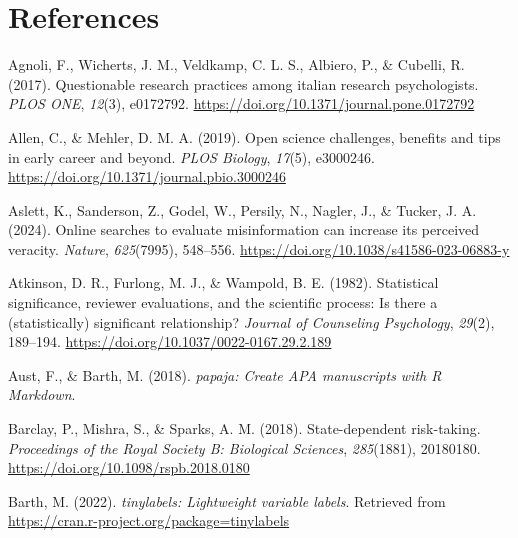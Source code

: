 \documentclass[
  ,man,mask,floatsintext]{apa6}
\newlength{\cslhangindent}
\newlength{\cslentryspacingunit} %
\newenvironment{CSLReferences}[2] %
 {%
  \setlength{\parindent}{0pt}
  \ifodd #1
  \let\oldpar\par
  \def\par{\hangindent=\cslhangindent\oldpar}
  \fi
  \setlength{\parskip}{#2\cslentryspacingunit}
 }%
 {}
\begin{document}
\hypertarget{references}{%
\section{References}\label{references}}

\setlength{\parindent}{-0.2in}
\setlength{\leftskip}{0.2in}


\hypertarget{refs}{}
\begin{CSLReferences}{1}{0}
\leavevmode{}%
Agnoli, F., Wicherts, J. M., Veldkamp, C. L. S., Albiero, P., \& Cubelli, R. (2017). Questionable research practices among italian research psychologists. \emph{PLOS ONE}, \emph{12}(3), e0172792. \url{https://doi.org/10.1371/journal.pone.0172792}

\leavevmode{}%
Allen, C., \& Mehler, D. M. A. (2019). Open science challenges, benefits and tips in early career and beyond. \emph{PLOS Biology}, \emph{17}(5), e3000246. \url{https://doi.org/10.1371/journal.pbio.3000246}

\leavevmode{}%
Aslett, K., Sanderson, Z., Godel, W., Persily, N., Nagler, J., \& Tucker, J. A. (2024). Online searches to evaluate misinformation can increase its perceived veracity. \emph{Nature}, \emph{625}(7995), 548--556. \url{https://doi.org/10.1038/s41586-023-06883-y}

\leavevmode{}%
Atkinson, D. R., Furlong, M. J., \& Wampold, B. E. (1982). Statistical significance, reviewer evaluations, and the scientific process: {Is} there a (statistically) significant relationship? \emph{Journal of Counseling Psychology}, \emph{29}(2), 189--194. \url{https://doi.org/10.1037/0022-0167.29.2.189}

\leavevmode{}%
Aust, F., \& Barth, M. (2018). \emph{{papaja}: {Create APA} manuscripts with {R Markdown}}.

\leavevmode{}%
Barclay, P., Mishra, S., \& Sparks, A. M. (2018). State-dependent risk-taking. \emph{Proceedings of the Royal Society B: Biological Sciences}, \emph{285}(1881), 20180180. \url{https://doi.org/10.1098/rspb.2018.0180}

\leavevmode{}%
Barth, M. (2022). \emph{{tinylabels}: Lightweight variable labels}. Retrieved from \url{https://cran.r-project.org/package=tinylabels}


\end{CSLReferences}
\end{document}
